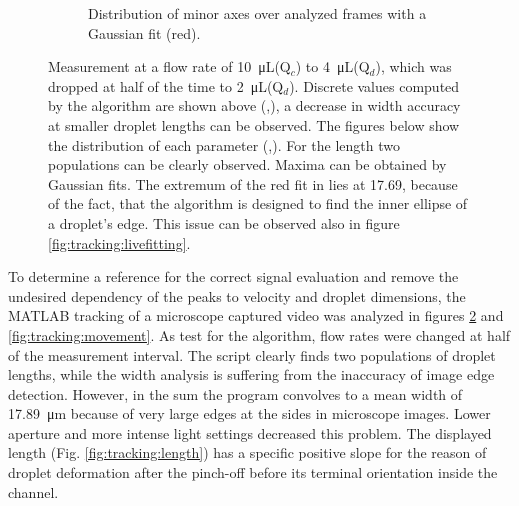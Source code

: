 \begin{figure}[h]
\begin{subfigure}[r]{0.49\textwidth}
	\caption{Distribution of minor axes over analyzed frames with a Gaussian fit (red).}
	\label{fig:tracking:histWidth}
\end{subfigure}
	\caption{Measurement at a flow rate of \SI{10}{\micro\liter}(Q$_c$) to \SI{4}{\micro\liter}(Q$_d$), which was dropped at half of the time to \SI{2}{\micro\liter}(Q$_d$). Discrete values computed by the algorithm are shown above (\protect{},\protect{}), a decrease in width accuracy at smaller droplet lengths can be observed. The figures below show the distribution of each parameter (\protect{},\protect{}). For the length two populations can be clearly observed. Maxima can be obtained by Gaussian fits. The extremum of the red fit in \protect{} lies at 17.69, because of the fact, that the algorithm is designed to find the inner ellipse of a droplet's edge. This issue can be observed also in figure \ref{fig:tracking:livefitting}.}
	\label{fig:tracking:dims}
\end{figure}

To determine a reference for the correct signal evaluation and remove the undesired dependency of the peaks to velocity and droplet dimensions, the MATLAB tracking of a microscope captured video was analyzed in figures \ref{fig:tracking:dims} and \ref{fig:tracking:movement}. As test for the algorithm, flow rates were changed at half of the measurement interval. The script clearly finds two populations of droplet lengths, while the width analysis is suffering from the inaccuracy of image edge detection.
\newpage
However, in the sum the program convolves to a mean width of \SI{17.89}{\micro\meter} because of very large edges at the sides in microscope images. Lower aperture and more intense light settings decreased this problem. The displayed length (Fig. \ref{fig:tracking:length}) has a specific positive slope for the reason of droplet deformation after the pinch-off before its terminal orientation inside the channel.

